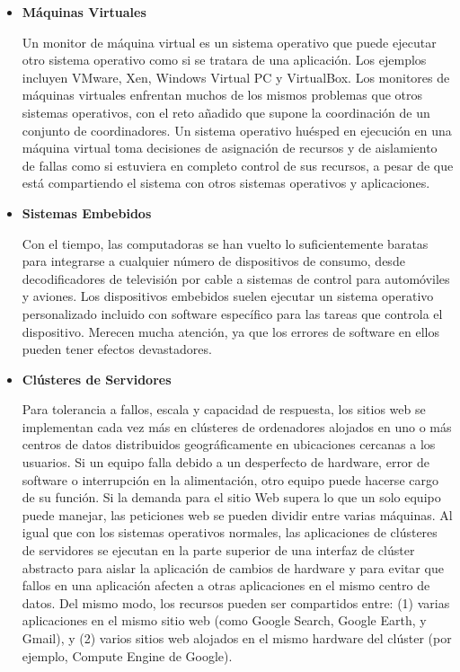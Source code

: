 \documentclass[10pt]{book}
\begin{document}
\begin{itemize}
\item \textbf{Máquinas Virtuales}

Un monitor de máquina virtual es un sistema operativo que puede ejecutar otro sistema operativo como si se tratara de una aplicación. Los ejemplos incluyen VMware, Xen, Windows Virtual PC y VirtualBox. Los monitores de máquinas virtuales enfrentan muchos de los mismos problemas que otros sistemas operativos, con el reto añadido que supone la coordinación de un conjunto de coordinadores. Un sistema operativo huésped en ejecución en una máquina virtual toma decisiones de asignación de recursos y de aislamiento de fallas como si estuviera en completo control de sus recursos, a pesar de que está compartiendo el sistema con otros sistemas operativos y aplicaciones.

\item \textbf{Sistemas Embebidos}

Con el tiempo, las computadoras se han vuelto lo suficientemente baratas para integrarse a cualquier número de dispositivos de consumo, desde decodificadores de televisión por cable a sistemas de control para automóviles y aviones. Los dispositivos embebidos suelen ejecutar un sistema operativo personalizado incluido con software específico para las tareas que controla el dispositivo. Merecen mucha atención, ya que los errores de software en ellos pueden tener efectos devastadores.

\item \textbf{Clústeres de Servidores}

Para tolerancia a fallos, escala y capacidad de respuesta, los sitios web se implementan cada vez más en clústeres de ordenadores alojados en uno o más centros de datos distribuidos geográficamente en ubicaciones cercanas a los usuarios. Si un equipo falla debido a un desperfecto de hardware, error de software o interrupción en la alimentación, otro equipo puede hacerse cargo de su función. Si la demanda para el sitio Web supera lo que un solo equipo puede manejar, las peticiones web se pueden dividir entre varias máquinas. Al igual que con los sistemas operativos normales, las aplicaciones de clústeres de servidores se ejecutan en la parte superior de una interfaz de clúster abstracto para aislar la aplicación de cambios de hardware y para evitar que fallos en una aplicación afecten a otras aplicaciones en el mismo centro de datos. Del mismo modo, los recursos pueden ser compartidos entre: (1) varias aplicaciones en el mismo sitio web (como Google Search, Google Earth, y Gmail), y (2) varios sitios web alojados en el mismo hardware del clúster (por ejemplo, Compute Engine de Google).
\end{itemize}
\end{document}
